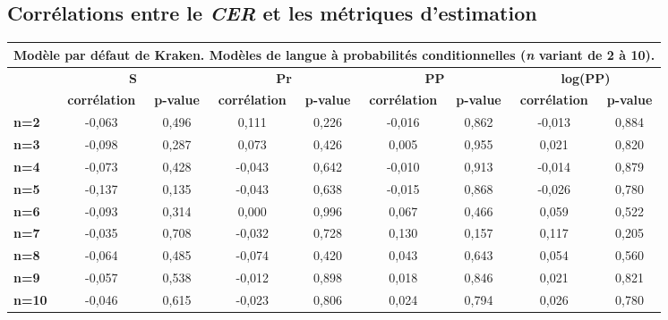 \documentclass[10pt,twoside]{article}
\begin{document}
    \subsection{Corrélations entre le \textit{CER} et les métriques d'estimation}
    \begin{table}
    \begin{center}
    \begin{scriptsize}
    
    \begin{tabular}{|l|c|c|c|c|c|c|c|c|}

    \multicolumn{9}{c}{{\footnotesize Modèle par défaut de Kraken. Modèles de langue à probabilités conditionnelles (\textit{n} variant de 2 à 10).}}\\\hline
    \multirow{2}{*}{\textbf{}} & \multicolumn{2}{c|}{\textbf{S}}         & \multicolumn{2}{c|}{\textbf{Pr}}        & \multicolumn{2}{c|}{\textbf{PP}}        & \multicolumn{2}{c|}{\textbf{log(PP)}}   \\ 
    \cline{2-9} & \textbf{corrélation} & \textbf{p-value} & \textbf{corrélation} & \textbf{p-value} & \textbf{corrélation} & \textbf{p-value} & \textbf{corrélation} & \textbf{p-value} \\ \hline
    
    \textbf{n=2}  & -0,063 & 0,496 & 0,111  & 0,226 & -0,016 & 0,862 & -0,013 & 0,884 \\ \hline
    \textbf{n=3}  & -0,098 & 0,287 & 0,073  & 0,426 & 0,005  & 0,955 & 0,021  & 0,820 \\ \hline
    \textbf{n=4}  & -0,073 & 0,428 & -0,043 & 0,642 & -0,010 & 0,913 & -0,014 & 0,879 \\ \hline
    \textbf{n=5}  & -0,137 & 0,135 & -0,043 & 0,638 & -0,015 & 0,868 & -0,026 & 0,780 \\ \hline
    \textbf{n=6}  & -0,093 & 0,314 & 0,000  & 0,996 & 0,067  & 0,466 & 0,059  & 0,522 \\ \hline
    \textbf{n=7}  & -0,035 & 0,708 & -0,032 & 0,728 & 0,130  & 0,157 & 0,117  & 0,205 \\ \hline
    \textbf{n=8}  & -0,064 & 0,485 & -0,074 & 0,420 & 0,043  & 0,643 & 0,054  & 0,560 \\ \hline
    \textbf{n=9}  & -0,057 & 0,538 & -0,012 & 0,898 & 0,018  & 0,846 & 0,021  & 0,821 \\ \hline
    \textbf{n=10} & -0,046 & 0,615 & -0,023 & 0,806 & 0,024  & 0,794 & 0,026  & 0,780 \\ \hline
    \end{tabular}


\end{scriptsize}
\end{center}
\end{table}
\end{document}
